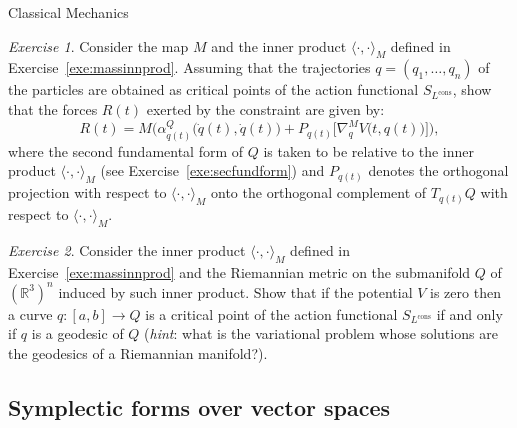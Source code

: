 \documentclass[oneside,a4paper,11pt]{amsbook}
\newcommand{\R}{\mathds R}
\theoremstyle{remark}\newtheorem{exercise}{Exercise}[chapter]
\theoremstyle{plain}\newtheorem{teo}{Theorem}[section]
\theoremstyle{plain}\newtheorem{lem}[teo]{Lemma}
\theoremstyle{plain}\newtheorem{prop}[teo]{Proposition}
\theoremstyle{plain}\newtheorem{cor}[teo]{Corollary}
\theoremstyle{definition}\newtheorem{defin}[teo]{Definition}
\theoremstyle{remark}\newtheorem{rem}[teo]{Remark}
\theoremstyle{definition}\newtheorem{notation}[teo]{Notation}
\theoremstyle{definition}\newtheorem{convention}[teo]{Convention}
\theoremstyle{definition}\newtheorem{example}[teo]{Example}
\numberwithin{section}{chapter}
\numberwithin{equation}{section}
\begin{document}
\begin{chapter}{Classical Mechanics}
\begin{exercise}
Consider the map $M$ and the inner product $\langle\cdot,\cdot\rangle_M$ defined in Exercise~\ref{exe:massinnprod}. Assuming
that the trajectories $q=(q_1,\ldots,q_n)$ of the particles are obtained as critical points of the action functional
$S_{L^{\mathrm{cons}}}$, show that the forces $R(t)$ exerted by the constraint are given by:
\[R(t)=M\Big(\alpha^Q_{q(t)}\big(\dot q(t),\dot q(t)\big)+P_{q(t)}\big[\nabla^M_qV\big(t,q(t)\big)\big]\Big),\]
where the second fundamental form of $Q$ is taken to be relative to the inner product $\langle\cdot,\cdot\rangle_M$
(see Exercise~\ref{exe:secfundform}) and $P_{q(t)}$ denotes the orthogonal projection with respect to $\langle\cdot,\cdot\rangle_M$
onto the orthogonal complement of $T_{q(t)}Q$ with respect to $\langle\cdot,\cdot\rangle_M$.
\end{exercise}

\begin{exercise}\label{exe:geodesics}
Consider the inner product $\langle\cdot,\cdot\rangle_M$ defined in Exercise~\ref{exe:massinnprod} and the Riemannian
metric on the submanifold $Q$ of $(\R^3)^n$ induced by such inner product. Show that if the potential $V$ is zero
then a curve $q:[a,b]\to Q$ is a critical point of the action functional $S_{L^{\mathrm{cons}}}$ if and only if
$q$ is a geodesic of $Q$ ({\em hint}: what is the variational problem whose solutions are the geodesics of a Riemannian
manifold?).
\end{exercise}

\subsection*{Symplectic forms over vector spaces}


\end{chapter}
\end{document}
